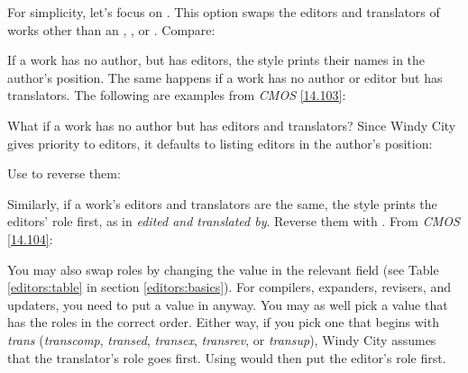 \documentclass[11pt,letterpaper,oneside]{article}
\begin{document}
For simplicity, let's focus on . This option swaps the
editors and translators of works other than an ,
, or . Compare:

\begin{citebib}
\item \cite{doe2010a}
\end{citebib}
\begin{citebib}
\item \cite{doe2010b}
\end{citebib}

If a work has no author, but has editors, the style prints their names
in the author's position. The same happens if a work has no author or
editor but has translators. The following are examples from
\textit{CMOS} \ref{14.103}:

\begin{citebib}
\item \cite[100]{egan2014}
\item \cite[34]{silverstein1974}
\end{citebib}

What if a work has no author but has editors and translators? Since
Windy City gives priority to editors, it defaults to listing editors
in the author's position:

\begin{citebib}
\item \cite{smith2002a}
\end{citebib}

\noindent Use  to reverse them:

\begin{citebib}
\item \cite{smith2002b}
\end{citebib}

Similarly, if a work's editors and translators are the same, the style
prints the editors' role first, as in \textit{edited and translated
by}. Reverse them with . From \textit{CMOS}
\ref{14.104}:

\begin{citebib}
\item \cite{menchu1999}
\end{citebib}

You may also swap roles by changing the value in the relevant
 field (see Table \ref{editors:table} in section
\ref{editors:basics}). For compilers, expanders, revisers, and
updaters, you need to put a value in  anyway. You
may as well pick a value that has the roles in the correct order.
Either way, if you pick one that begins with \textit{trans}
(\textit{transcomp}, \textit{transed}, \textit{transex},
\textit{transrev}, or \textit{transup}), Windy City assumes that the
translator's role goes first. Using  would then put the
editor's role first.
\end{document}
